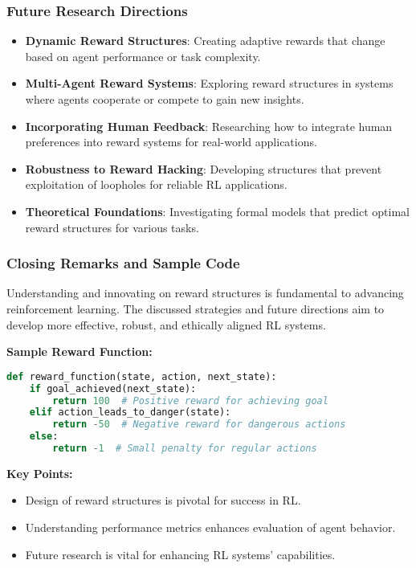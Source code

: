 \documentclass[aspectratio=169]{beamer}
\begin{document}
\begin{frame}[fragile]
    \frametitle{Future Research Directions}
    \begin{itemize}
        \item \textbf{Dynamic Reward Structures}: Creating adaptive rewards that change based on agent performance or task complexity.
        \item \textbf{Multi-Agent Reward Systems}: Exploring reward structures in systems where agents cooperate or compete to gain new insights.
        \item \textbf{Incorporating Human Feedback}: Researching how to integrate human preferences into reward systems for real-world applications.
        \item \textbf{Robustness to Reward Hacking}: Developing structures that prevent exploitation of loopholes for reliable RL applications.
        \item \textbf{Theoretical Foundations}: Investigating formal models that predict optimal reward structures for various tasks.
    \end{itemize}
\end{frame}

\begin{frame}[fragile]
    \frametitle{Closing Remarks and Sample Code}
    Understanding and innovating on reward structures is fundamental to advancing reinforcement learning. The discussed strategies and future directions aim to develop more effective, robust, and ethically aligned RL systems.

    \vspace{0.5cm}
    \textbf{Sample Reward Function:}
    \begin{lstlisting}[language=Python]
def reward_function(state, action, next_state):
    if goal_achieved(next_state):
        return 100  # Positive reward for achieving goal
    elif action_leads_to_danger(state):
        return -50  # Negative reward for dangerous actions
    else:
        return -1  # Small penalty for regular actions
    \end{lstlisting}
    
    \textbf{Key Points:}
    \begin{itemize}
        \item Design of reward structures is pivotal for success in RL.
        \item Understanding performance metrics enhances evaluation of agent behavior.
        \item Future research is vital for enhancing RL systems' capabilities.
    \end{itemize}
\end{frame}
\end{document}
